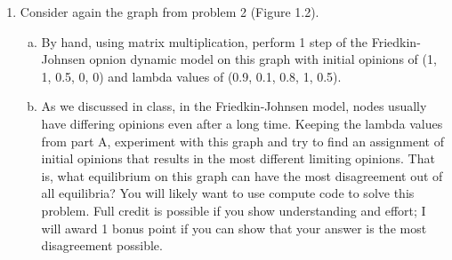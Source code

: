 \documentclass[11pt]{article}
\begin{document}
\begin{enumerate}
\begin{enumerate}[(a)]
	\end{enumerate}
\item Consider again the graph from problem 2 (Figure 1.2).
	\begin{enumerate}[(a)]
		\item By hand, using matrix multiplication, perform 1 step of the Friedkin-Johnsen opnion dynamic model on this graph with initial opinions of (1, 1, 0.5, 0, 0) and lambda values of (0.9, 0.1, 0.8, 1, 0.5).
		\item As we discussed in class, in the Friedkin-Johnsen model, nodes usually have differing opinions even after a long time. Keeping the lambda values from part A, experiment with this graph and try to find an assignment of initial opinions that results in the most different limiting opinions. That is, what equilibrium on this graph can have the most disagreement out of all equilibria? You will likely want to use compute code to solve this problem. Full credit is possible if you show understanding and effort; I will award 1 bonus point if you can show that your answer is the most disagreement possible.
	\end{enumerate}
\end{enumerate}
\end{document}

